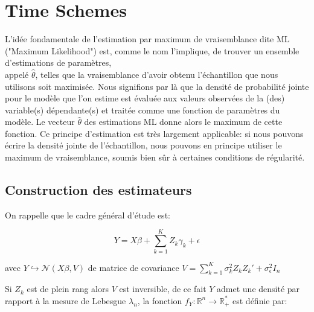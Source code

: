 \documentclass[11pt,fleqn]{book} %
\begin{document}
	
	\newpage
	
	
	
	
	\chapter{Time Schemes}
	
	
	\vspace{1em}
	
	L’idée fondamentale de l’estimation par maximum de vraisemblance dite ML ("Maximum Likelihood") est, comme le nom l’implique, de trouver un ensemble d’estimations de paramètres,\\ 
	appelé $\hat{\theta}$, telles que la vraisemblance d’avoir obtenu l’échantillon que nous utilisons soit maximisée. Nous signifions par là que la densité de probabilité jointe pour le modèle que l’on estime est évaluée aux valeurs observées de la (des) variable(s) dépendante(s) et traitée comme une fonction de paramètres du modèle. Le vecteur $\hat{\theta}$ des estimations ML donne alors
	le maximum de cette fonction. Ce principe d’estimation est très largement applicable: si nous pouvons écrire la densité jointe de l’échantillon, nous pouvons en principe utiliser le maximum de vraisemblance, soumis bien sûr à certaines conditions de régularité. 
	
	\vspace{1em}
	
	\section{Construction des estimateurs}
	
	\vspace{1em}
	
	On rappelle que le cadre général d'étude est: 
	
	\begin{equation*} 
		Y=X\beta+\sum_{k=1}^{K} Z_k \gamma_k+\epsilon 
	\end{equation*}
	
	avec \: $ Y\hookrightarrow\mathcal{N}(X\beta,V)$ \:de matrice de covariance $V=\sum_{k=1}^{K} \sigma_k^2 Z_k  Z_k'+\sigma_{\epsilon}^2 I_{n}$
	
	\vspace{1em}
	Si $Z_k$ est de plein rang alors $V$ est inversible, de ce fait $Y$ admet une densité par rapport à la mesure de Lebesgue $\lambda_{n}$, la fonction $f_{Y} : \mathbb{R}^{n} \rightarrow \mathbb{R}_{+}^{*}$ est définie par:
	
\end{document}
